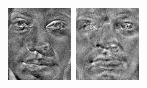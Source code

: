 \documentclass[times, utf8, seminar, numeric]{fer}
\begin{document}
\begin{figure}[!htb]
  \includegraphics[width=\linewidth]{raw/base4.jpg}
\endminipage\hfill
{}
  \includegraphics[width=\linewidth]{raw/base14.jpg}

\end{figure}
\end{document}
